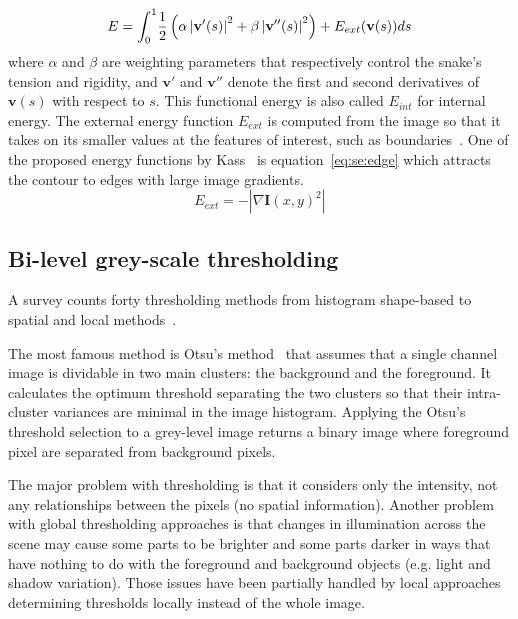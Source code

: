 \begin{equation}\label{eq:se:energy1}
  E = \int_0^1 \! \frac{1}{2} \left( \alpha \left|\mathbf{v}'(s) \right|^2 + \beta \left| \mathbf{v}''(s) \right|^2 \right) + E_{ext}(\mathbf{v}(s))ds\\
\end{equation}
where $\alpha$ and $\beta$ are weighting parameters that respectively control the snake's tension and rigidity, and $\mathbf{v}'$ and $\mathbf{v}''$ denote the first and second derivatives of $\mathbf{v}(s)$ with respect to $s$. This functional energy is also called $E_{int}$ for internal energy.
The external energy function $E_{ext}$ is computed from the image so that it takes on its smaller values at the features of interest, such as boundaries~\cite{Xu1998}.
One of the proposed energy functions by Kass~\cite{Kass1988} is equation~\ref{eq:se:edge} which attracts the contour to edges with large image gradients. 
\begin{equation}\label{eq:se:edge}
  E_{ext} = -|\nabla \mathbf{I}(x,y)^2|
\end{equation}


\subsection{Bi-level grey-scale thresholding} %
\label{sub:ap:bi_threshold}
A survey counts forty thresholding methods from histogram shape-based to spatial and local methods~\cite{sezgin2004survey}.
 
The most famous method is Otsu's method~\cite{otsu79} that assumes that a single channel image is dividable in two main clusters: the background and the foreground.
It calculates the optimum threshold separating the two clusters so that their intra-cluster variances are minimal in the image histogram.
Applying the Otsu's threshold selection to a grey-level image returns a binary image where foreground pixel are separated from background pixels.

The major problem with thresholding is that it considers only the intensity, not any relationships between the pixels (no spatial information).
Another problem with global thresholding approaches is that changes in illumination across the scene may cause some parts to be brighter and some parts darker in ways that have nothing to do with the foreground and background objects (e.g. light and shadow variation).
Those issues have been partially handled by local approaches determining thresholds locally instead of the whole image.%


